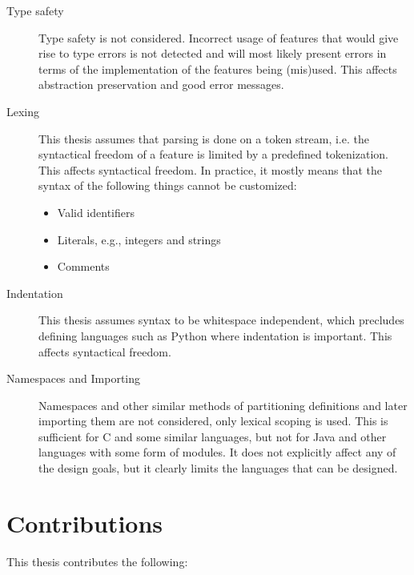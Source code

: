 \documentclass{kththesis}
\begin{document}
\begin{description}
  \item[Type safety] Type safety is not considered. Incorrect usage of features that would give rise to type errors is not detected and will most likely present errors in terms of the implementation of the features being (mis)used. This affects abstraction preservation and good error messages.

  \item[Lexing] This thesis assumes that parsing is done on a token stream, i.e. the syntactical freedom of a feature is limited by a predefined tokenization. This affects syntactical freedom. In practice, it mostly means that the syntax of the following things cannot be customized:
  \begin{itemize}
    \item Valid identifiers
    \item Literals, e.g., integers and strings
    \item Comments
  \end{itemize}

  \item[Indentation] This thesis assumes syntax to be whitespace independent, which precludes defining languages such as Python where indentation is important. This affects syntactical freedom.

  \item[Namespaces and Importing] Namespaces and other similar methods of partitioning definitions and later importing them are not considered, only lexical scoping is used. This is sufficient for C and some similar languages, but not for Java and other languages with some form of modules. It does not explicitly affect any of the design goals, but it clearly limits the languages that can be designed.
\end{description}

\section{Contributions} \label{sec:contributions}

This thesis contributes the following:
\end{document}
